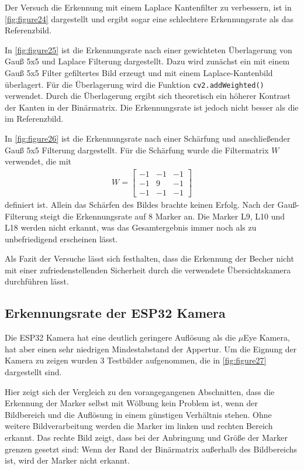     Der Versuch die Erkennung mit einem Laplace Kantenfilter zu verbessern, ist in \ref{fig:figure24} dargestellt und ergibt sogar eine schlechtere Erkennungsrate als das Referenzbild.
    
    In \ref{fig:figure25} ist die Erkennungsrate nach einer gewichteten Überlagerung von Gauß 5x5 und Laplace Filterung dargestellt. 
    Dazu wird zunächst ein mit einem Gauß 5x5 Filter gefiltertes Bild erzeugt und mit einem Laplace-Kantenbild überlagert. 
    Für die Überlagerung wird die Funktion \verb|cv2.addWeighted()| verwendet. 
    Durch die Überlagerung ergibt sich theoretisch ein höherer Kontrast der Kanten in der Binärmatrix. 
    Die Erkennungsrate ist jedoch nicht besser als die im Referenzbild.

    In \ref{fig:figure26} ist die Erkennungsrate nach einer Schärfung und anschließender Gauß 5x5 Filterung dargestellt.
    Für die Schärfung wurde die Filtermatrix $W$ verwendet, die mit 
    \begin{align*}
        W = \begin{bmatrix}
            -1 & -1 & -1 \\
            -1 & 9 & -1 \\
            -1 & -1 & -1
        \end{bmatrix}
    \end{align*}
    definiert ist. Allein das Schärfen des Bildes brachte keinen Erfolg. Nach der Gauß-Filterung steigt die Erkennungsrate auf 8 Marker an. 
    Die Marker L9, L10 und L18 werden nicht erkannt, was das Gesamtergebnis immer noch als zu unbefriedigend erscheinen lässt.

    Als Fazit der Versuche lässt sich festhalten, dass die Erkennung der Becher nicht mit einer zufriedenstellenden Sicherheit durch die verwendete Übersichtskamera durchführen lässt. 

    \subsection{Erkennungsrate der ESP32 Kamera}\label{ErkennungsrateESP32}

    Die ESP32 Kamera hat eine deutlich geringere Auflösung als die $\mu$Eye Kamera, hat aber einen sehr niedrigen Mindestabstand der Appertur.
    Um die Eignung der Kamera zu zeigen wurden 3 Testbilder aufgenommen, die in \ref{fig:figure27} dargestellt sind.

    Hier zeigt sich der Vergleich zu den vorangegangenen Abschnitten, dass die Erkennung der Marker selbst mit Wölbung kein Problem ist, wenn der Bildbereich und die Auflösung in einem günstigen Verhältnis stehen.
    Ohne weitere Bildverarbeitung werden die Marker im linken und rechten Bereich erkannt. 
    Das rechte Bild zeigt, dass bei der Anbringung und Größe der Marker grenzen gesetzt sind: 
    Wenn der Rand der Binärmatrix außerhalb des Bildbereichs ist, wird der Marker nicht erkannt.

